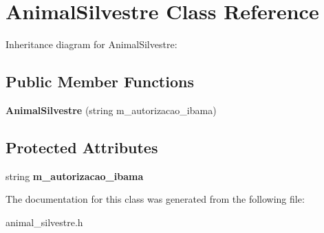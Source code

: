 \hypertarget{classAnimalSilvestre}{}\section{Animal\+Silvestre Class Reference}
\label{classAnimalSilvestre}


Inheritance diagram for Animal\+Silvestre\+:
\subsection*{Public Member Functions}
\begin{DoxyCompactItemize}
\item 
\mbox{\label{classAnimalSilvestre_a7399ea0c4c3a901a13746cd70dddfbd7}} 
{\bfseries Animal\+Silvestre} (string m\+\_\+autorizacao\+\_\+ibama)
\end{DoxyCompactItemize}
\subsection*{Protected Attributes}
\begin{DoxyCompactItemize}
\item 
\mbox{\label{classAnimalSilvestre_a366b2d0e615adccc3228e9bcbc5f467e}} 
string {\bfseries m\+\_\+autorizacao\+\_\+ibama}
\end{DoxyCompactItemize}


The documentation for this class was generated from the following file\+:\begin{DoxyCompactItemize}
\item 
animal\+\_\+silvestre.\+h\end{DoxyCompactItemize}
